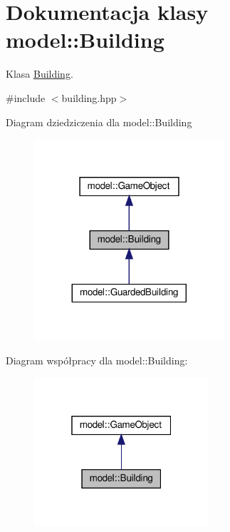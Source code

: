 \hypertarget{classmodel_1_1Building}{}\section{Dokumentacja klasy model\+:\+:Building}
\label{classmodel_1_1Building}


Klasa \hyperlink{classmodel_1_1Building}{Building}.  




{\ttfamily \#include $<$building.\+hpp$>$}



Diagram dziedziczenia dla model\+:\+:Building\nopagebreak
\begin{figure}[H]
\begin{center}
\leavevmode
\includegraphics[width=200pt]{classmodel_1_1Building__inherit__graph}
\end{center}
\end{figure}


Diagram współpracy dla model\+:\+:Building\+:\nopagebreak
\begin{figure}[H]
\begin{center}
\leavevmode
\includegraphics[width=184pt]{classmodel_1_1Building__coll__graph}
\end{center}
\end{figure}
